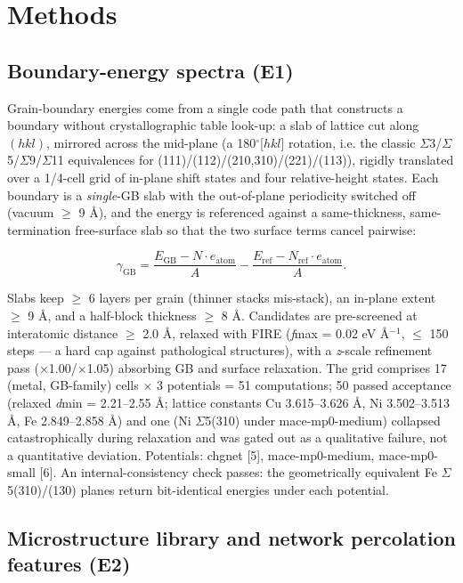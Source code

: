 \documentclass[12pt]{article}
\begin{document}
\section{Methods}

\subsection{Boundary-energy spectra (E1)}

Grain-boundary energies come from a single code path that constructs a boundary without crystallographic table look-up: a slab of lattice cut along $(hkl)$, mirrored across the mid-plane (a 180$^\circ$[$hkl$] rotation, i.e. the classic $\Sigma$3/$\Sigma$5/$\Sigma$9/$\Sigma$11 equivalences for (111)/(112)/(210,310)/(221)/(113)), rigidly translated over a 1/4-cell grid of in-plane shift states and four relative-height states. Each boundary is a \textit{single}-GB slab with the out-of-plane periodicity switched off (vacuum $\ge$ 9 \AA), and the energy is referenced against a same-thickness, same-termination free-surface slab so that the two surface terms cancel pairwise:

\[
\gamma_{\mathrm{GB}} = \frac{E_{\mathrm{GB}} - N\cdot e_{\mathrm{atom}}}{A} - \frac{E_{\mathrm{ref}} - N_{\mathrm{ref}}\cdot e_{\mathrm{atom}}}{A}.
\]

Slabs keep $\ge$ 6 layers per grain (thinner stacks mis-stack), an in-plane extent $\ge$ 9 \AA, and a half-block thickness $\ge$ 8 \AA. Candidates are pre-screened at interatomic distance $\ge$ 2.0 \AA, relaxed with FIRE (\textit{f}max = 0.02 eV \AA$^{-1}$, $\le$ 150 steps --- a hard cap against pathological structures), with a \textit{z}-scale refinement pass ($\times$1.00/$\times$1.05) absorbing GB and surface relaxation. The grid comprises 17 (metal, GB-family) cells $\times$ 3 potentials = 51 computations; 50 passed acceptance (relaxed \textit{d}min = 2.21--2.55 \AA; lattice constants Cu 3.615--3.626 \AA, Ni 3.502--3.513 \AA, Fe 2.849--2.858 \AA) and one (Ni $\Sigma$5(310) under mace-mp0-medium) collapsed catastrophically during relaxation and was gated out as a qualitative failure, not a quantitative deviation. Potentials: chgnet [5], mace-mp0-medium, mace-mp0-small [6]. An internal-consistency check passes: the geometrically equivalent Fe $\Sigma$5(310)/(130) planes return bit-identical energies under each potential.

\subsection{Microstructure library and network percolation features (E2)}
\end{document}
